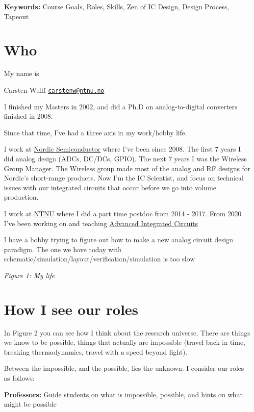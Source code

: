 \textbf{Keywords:} Course Goals, Roles, Skills, Zen of IC Design, Design
Process, Tapeout

\section{Who}\label{who}

My name is

Carsten Wulff
\href{mailto:carstenw@ntnu.no}{\nolinkurl{carstenw@ntnu.no}}

I finished my Masters in 2002, and did a Ph.D on analog-to-digital
converters finished in 2008.

Since that time, I've had a three axis in my work/hobby life.

I work at \href{https://www.nordicsemi.com}{Nordic Semiconductor} where
I've been since 2008. The first 7 years I did analog design (ADCs,
DC/DCs, GPIO). The next 7 years I was the Wireless Group Manager. The
Wireless group made most of the analog and RF designs for Nordic's
short-range products. Now I'm the IC Scientist, and focus on technical
issues with our integrated circuits that occur before we go into volume
production.

I work at \href{https://ntnu.no}{NTNU} where I did a part time postdoc
from 2014 - 2017. From 2020 I've been working on and teaching
\href{https://www.ntnu.edu/studies/courses/TFE4188\#tab=omEmnet}{Advanced
Integrated Circuits}

I have a hobby trying to figure out how to make a new analog circuit
design paradigm. The one we have today with
schematic/simulation/layout/verification/simulation is too slow


{
\centering
{}
}

\emph{Figure 1: My life }

\section{How I see our roles}\label{how-i-see-our-roles}

In Figure 2 you can see how I think about the research universe. There
are things we know to be possible, things that actually are impossible
(travel back in time, breaking thermodynamics, travel with a speed
beyond light).

Between the impossible, and the possible, lies the unknown. I consider
our roles as follows:

\textbf{Professors:} Guide students on what is impossible, possible, and
hints on what might be possible

